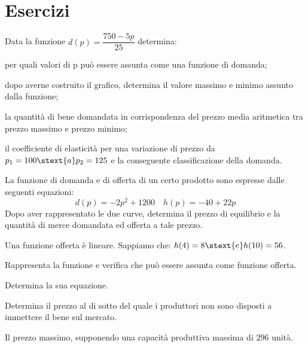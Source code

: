 

\section{Esercizi}



\begin{esercizio}\label{ese:03.1}
Data la funzione \quad \(d(p) = \dfrac{750 -5p}{25}\) \quad determina: 
 \begin{enumeratea}
  \item per quali valori di p può essere assunta come una funzione di 
domanda;
  \item dopo averne costruito il grafico, determina il valore massimo e 
minimo assunto dalla funzione;
  \item la quantità di bene domandata in corrispondenza del prezzo media 
aritmetica tra prezzo massimo e prezzo minimo;
  \item il coefficiente di elasticità per una variazione di prezzo da 
\(p_1 = 100 \stext{ a } p_2 = 125\) 
e la conseguente classificazione della domanda.
 \end{enumeratea}
\end{esercizio}

\begin{esercizio}
\label{ese:D.19}
La funzione di domanda e di offerta di un certo prodotto sono espresse 
dalle seguenti equazioni:
\[d(p) = -2p^2 +1200 \quad h(p) = -40 +22p\]
Dopo aver rappresentato le due curve, determina il prezzo di equilibrio e la 
quantità di merce domandata ed offerta a tale prezzo.
\end{esercizio}

\begin{esercizio}\label{ese:03.1}
Una funzione offerta è lineare. Sappiamo che:
\(h(4) = 8 \stext{ e } h(10) = 56\).
 \begin{enumeratea}
  \item Rappresenta la funzione e verifica che può essere assunta come 
funzione offerta.
  \item Determina la sua equazione.
  \item Determina il prezzo al di sotto del quale i produttori non sono 
disposti a immettere il bene sul mercato.
  \item Il prezzo massimo, supponendo una capacità produttiva massima di 
\(296\) unità.
 \end{enumeratea}
\end{esercizio}

